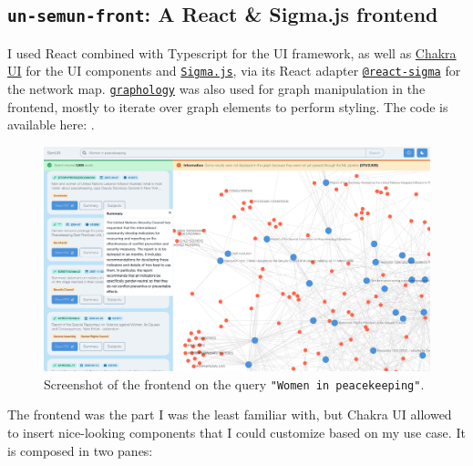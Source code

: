 
\subsection{\texttt{un-semun-front}: A React \& Sigma.js frontend} \label{ssec:un-semun-front-a-react-sigma-js-frontend}

I used React combined with Typescript for the UI framework, as well as \href{https://chakra-ui.com/}{Chakra UI} for the UI components and \href{https://www.sigmajs.org/}{\texttt{Sigma.js}}, via its React adapter \href{https://sim51.github.io/react-sigma/}{\texttt{@react-sigma}} for the network map. \href{https://graphology.github.io/}{\texttt{graphology}} was also used for graph manipulation in the frontend, mostly to iterate over graph elements to perform styling. The code is available here: .


\begin{figure}[!htb]
    \centering

    \includegraphics[width=\linewidth]{res/un-frontend.png}
    \caption{Screenshot of the frontend on the query \texttt{"Women in peacekeeping"}.}

    \label{fig:frontend-screenshot}
\end{figure}


The frontend was the part I was the least familiar with, but Chakra UI allowed to insert nice-looking components that I could customize based on my use case. It is composed in two panes:

